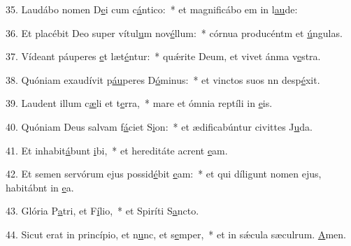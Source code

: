 35. Laudábo nomen D\uline{e}i cum c\uline{á}ntico:~* et magnificábo em in l\uline{au}de:\par 
36. Et placébit Deo super vítul\uline{u}m nov\uline{é}llum:~* córnua producéntm et \uline{ú}ngulas.\par 
37. Vídeant páuperes \uline{e}t læt\uline{é}ntur:~* quǽrite Deum, et vivet ánma v\uline{e}stra.\par 
38. Quóniam exaudívit p\uline{áu}peres D\uline{ó}minus:~* et vinctos suos nn desp\uline{é}xit.\par 
39. Laudent illum c\uline{æ}li et t\uline{e}rra,~* mare et ómnia reptíli in \uline{e}is.\par 
40. Quóniam Deus salvam f\uline{á}ciet S\uline{i}on:~* et ædificabúntur civittes J\uline{u}da.\par 
41. Et inhabit\uline{á}bunt \uline{i}bi,~* et hereditáte acrent \uline{e}am.\par 
42. Et semen servórum ejus possid\uline{é}bit \uline{e}am:~* et qui díligunt nomen ejus, habitábnt in \uline{e}a.\par 
43. Glória P\uline{a}tri, et F\uline{í}lio,~* et Spiríti S\uline{a}ncto.\par 
44. Sicut erat in princípio, et n\uline{u}nc, et s\uline{e}mper,~* et in sǽcula sæculrum. \uline{A}men.\par 
